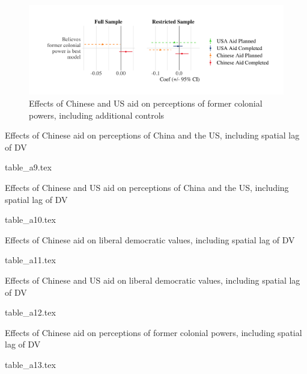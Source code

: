 \documentclass[9pt]{article}
\begin{document}
\begin{figure}[H]
\centering
\includegraphics[width=1\textwidth]{figures/figure_a15.png}
\caption{Effects of Chinese and US aid on perceptions of former colonial powers, including additional controls}
\end{figure}

\newpage %

\setlength{\tabcolsep}{5pt}
\begin{table}[H]
\caption{Effects of Chinese aid on perceptions of China and the US, including spatial lag of DV}
\label{reg}
\centering
{table_a9.tex}
\end{table}

\setlength{\tabcolsep}{5pt}
\begin{table}[H]
\caption{Effects of Chinese and US aid on perceptions of China and the US, including spatial lag of DV}
\label{reg}
\centering
{table_a10.tex}
\end{table}

\newpage %

\setlength{\tabcolsep}{5pt}
\begin{table}[H]
\caption{Effects of Chinese aid on liberal democratic values, including spatial lag of DV}
\label{reg}
\centering
{table_a11.tex}
\end{table}

\setlength{\tabcolsep}{5pt}
\begin{table}[H]
\caption{Effects of Chinese and US aid on liberal democratic values, including spatial lag of DV}
\label{reg}
\centering
{table_a12.tex}
\end{table}

\newpage %

\setlength{\tabcolsep}{5pt}
\begin{table}[H]
\caption{Effects of Chinese aid on perceptions of former colonial powers, including spatial lag of DV}
\label{reg}
\centering
{table_a13.tex}
\end{table}
\end{document}
